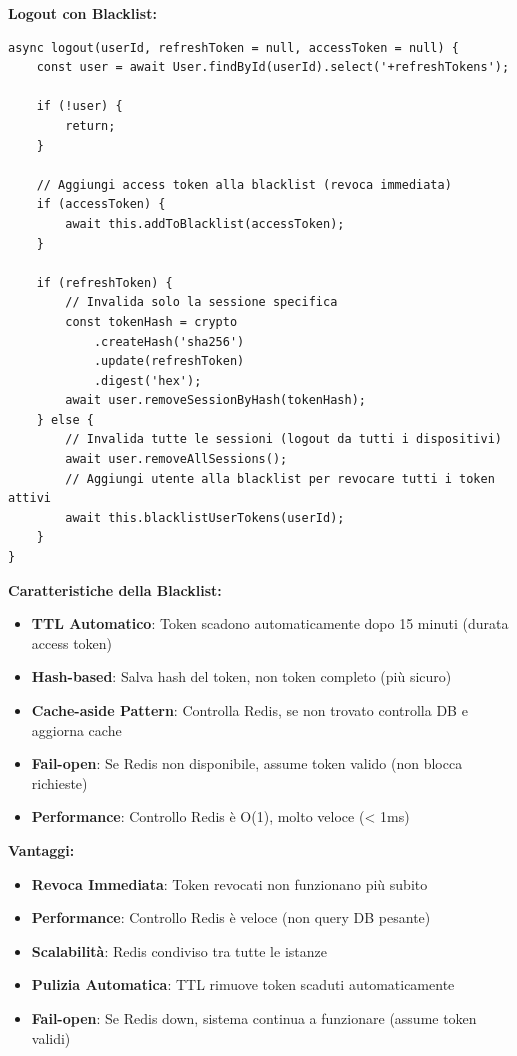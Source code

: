 \documentclass[11pt,a4paper]{article}
\begin{document}
\textbf{Logout con Blacklist:}

\begin{lstlisting}[caption=Logout con Revoca Immediata Token]
async logout(userId, refreshToken = null, accessToken = null) {
    const user = await User.findById(userId).select('+refreshTokens');
    
    if (!user) {
        return;
    }

    // Aggiungi access token alla blacklist (revoca immediata)
    if (accessToken) {
        await this.addToBlacklist(accessToken);
    }

    if (refreshToken) {
        // Invalida solo la sessione specifica
        const tokenHash = crypto
            .createHash('sha256')
            .update(refreshToken)
            .digest('hex');
        await user.removeSessionByHash(tokenHash);
    } else {
        // Invalida tutte le sessioni (logout da tutti i dispositivi)
        await user.removeAllSessions();
        // Aggiungi utente alla blacklist per revocare tutti i token attivi
        await this.blacklistUserTokens(userId);
    }
}
\end{lstlisting}

\textbf{Caratteristiche della Blacklist:}
\begin{itemize}
    \item \textbf{TTL Automatico}: Token scadono automaticamente dopo 15 minuti (durata access token)
    \item \textbf{Hash-based}: Salva hash del token, non token completo (più sicuro)
    \item \textbf{Cache-aside Pattern}: Controlla Redis, se non trovato controlla DB e aggiorna cache
    \item \textbf{Fail-open}: Se Redis non disponibile, assume token valido (non blocca richieste)
    \item \textbf{Performance}: Controllo Redis è O(1), molto veloce (< 1ms)
\end{itemize}

\textbf{Vantaggi:}
\begin{itemize}
    \item \textbf{Revoca Immediata}: Token revocati non funzionano più subito
    \item \textbf{Performance}: Controllo Redis è veloce (non query DB pesante)
    \item \textbf{Scalabilità}: Redis condiviso tra tutte le istanze
    \item \textbf{Pulizia Automatica}: TTL rimuove token scaduti automaticamente
    \item \textbf{Fail-open}: Se Redis down, sistema continua a funzionare (assume token validi)
\end{itemize}
\end{document}
